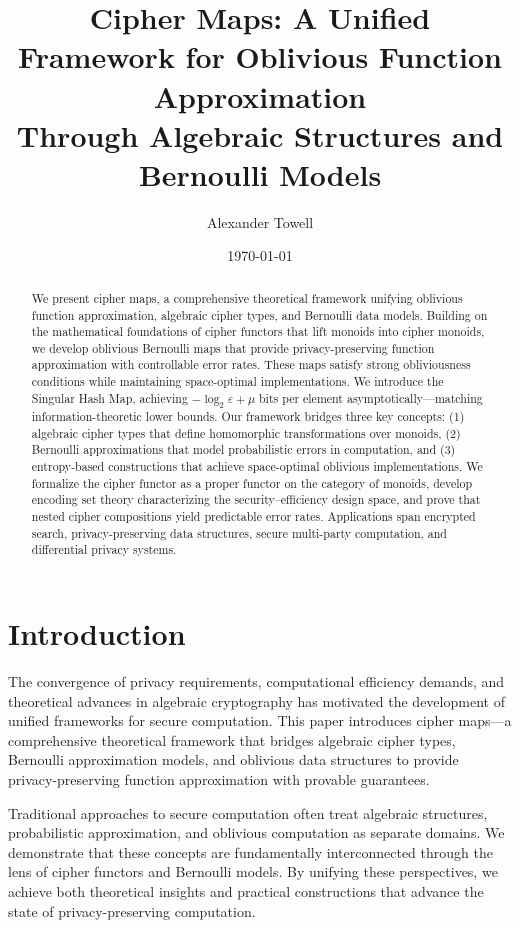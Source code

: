 \documentclass[11pt]{article}
\title{Cipher Maps: A Unified Framework for Oblivious Function Approximation\\Through Algebraic Structures and Bernoulli Models}
\author{Alexander Towell}
\date{\today}
\theoremstyle{definition}
\theoremstyle{plain}
\theoremstyle{remark}
\begin{document}
\maketitle

\begin{abstract}
We present cipher maps, a comprehensive theoretical framework unifying oblivious function approximation, algebraic cipher types, and Bernoulli data models. Building on the mathematical foundations of cipher functors that lift monoids into cipher monoids, we develop oblivious Bernoulli maps that provide privacy-preserving function approximation with controllable error rates. These maps satisfy strong obliviousness conditions while maintaining space-optimal implementations. We introduce the Singular Hash Map, achieving $-\log_2 \varepsilon + \mu$ bits per element asymptotically---matching information-theoretic lower bounds. Our framework bridges three key concepts: (1) algebraic cipher types that define homomorphic transformations over monoids, (2) Bernoulli approximations that model probabilistic errors in computation, and (3) entropy-based constructions that achieve space-optimal oblivious implementations. We formalize the cipher functor as a proper functor on the category of monoids, develop encoding set theory characterizing the security--efficiency design space, and prove that nested cipher compositions yield predictable error rates. Applications span encrypted search, privacy-preserving data structures, secure multi-party computation, and differential privacy systems.
\end{abstract}

\section{Introduction}

The convergence of privacy requirements, computational efficiency demands, and theoretical advances in algebraic cryptography has motivated the development of unified frameworks for secure computation. This paper introduces cipher maps---a comprehensive theoretical framework that bridges algebraic cipher types, Bernoulli approximation models, and oblivious data structures to provide privacy-preserving function approximation with provable guarantees.

Traditional approaches to secure computation often treat algebraic structures, probabilistic approximation, and oblivious computation as separate domains. We demonstrate that these concepts are fundamentally interconnected through the lens of cipher functors and Bernoulli models. By unifying these perspectives, we achieve both theoretical insights and practical constructions that advance the state of privacy-preserving computation.
\end{document}
